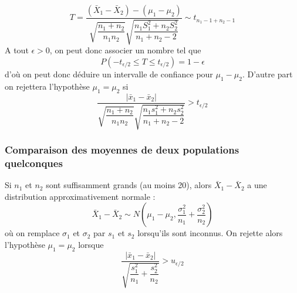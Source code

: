 $$\boxed{T = \dfrac{(\bar{X}_1 - \bar{X}_2) - (\mu_1 - \mu_2)}{\sqrt{\dfrac{n_1+n_2}{n_1n_2}}\sqrt{\dfrac{n_1S^2_1+n_2S_2^2}{n_1+n_2-2}}} \sim t_{n_1-1+n_2-1}}$$
A tout $\epsilon > 0$, on peut donc associer un nombre tel que $$P\left(-t_{\epsilon/2} \leq T \leq t_{\epsilon/2} \right) = 1 - \epsilon$$ d'où on peut donc déduire un intervalle de confiance pour $\mu_1 - \mu_2$. D'autre part on rejettera l'hypothèse $\mu_1 = \mu_2$ si $$\dfrac{|\bar{x}_1 - \bar{x}_2|}{\sqrt{\dfrac{n_1+n_2}{n_1n_2}}\sqrt{\dfrac{n_1s^2_1+n_2s_2^2}{n_1+n_2-2}}} > t_{\epsilon/2}$$










\newpage
\subsubsection{Comparaison des moyennes de deux populations quelconques}
Si $n_1$ et $n_2$ sont suffisamment grands (au moins 20), alors $\bar{X}_1 - \bar{X}_2$ a une distribution
approximativement normale :$$\boxed{\bar{X}_1 - \bar{X}_2 \sim N\left(\mu_1 - \mu_2, \dfrac{\sigma_1^2}{n_1} + \dfrac{\sigma_2^2}{n_2}\right)}$$
où on remplace $\sigma_1$ et $\sigma_2$ par $s_1$ et $s_2$ lorsqu'ils sont inconnus. On rejette alors l'hypothèse $\mu_1 = \mu_2$ lorsque $$\dfrac{\left|\bar{x}_1 - \bar{x}_2\right|}{\sqrt{\dfrac{s_1^2}{n_1} + \dfrac{s_2^2}{n_2}}} > u_{\epsilon/2}$$
